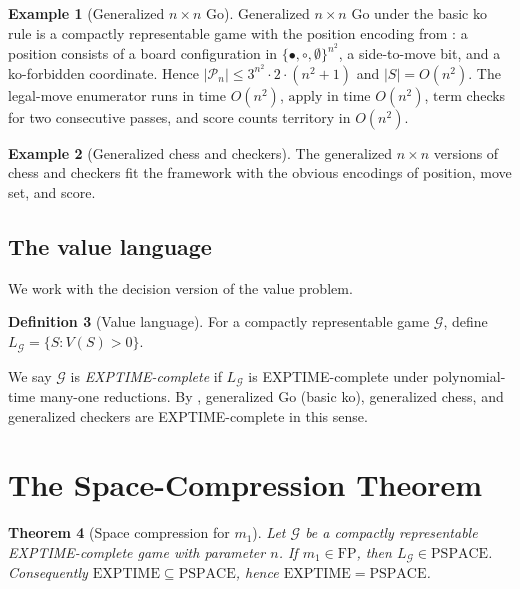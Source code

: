 \documentclass[11pt,a4paper]{amsart}
\theoremstyle{plain}
\newtheorem{theorem}{Theorem}[section]
\theoremstyle{definition}
\newtheorem{definition}[theorem]{Definition}
\newtheorem{example}[theorem]{Example}
\theoremstyle{remark}
\newcommand{\FP}{\mathrm{FP}}
\newcommand{\EXPTIME}{\mathrm{EXPTIME}}
\newcommand{\PSPACE}{\mathrm{PSPACE}}
\newcommand{\Apply}{\mathrm{apply}}
\newcommand{\score}{\mathrm{score}}
\begin{document}
\begin{example}[Generalized $n \times n$ Go]
\label{ex:go}
Generalized $n \times n$ Go under the basic ko rule is a compactly
representable game with the position encoding from \cite{Rob83}: a
position consists of a board configuration in $\{\bullet, \circ,
\emptyset\}^{n^2}$, a side-to-move bit, and a ko-forbidden coordinate.
Hence $|\mathcal{P}_n| \leq 3^{n^2} \cdot 2 \cdot (n^2 + 1)$ and
$|S| = O(n^2)$. The legal-move enumerator runs in time $O(n^2)$,
$\Apply$ in time $O(n^2)$, $\mathrm{term}$ checks for two consecutive
passes, and $\score$ counts territory in $O(n^2)$.
\end{example}

\begin{example}[Generalized chess and checkers]
\label{ex:chess}
The generalized $n \times n$ versions of chess \cite{FL81} and
checkers \cite{Rob84} fit the framework with the obvious encodings of
position, move set, and score.
\end{example}

\subsection{The value language}

We work with the decision version of the value problem.

\begin{definition}[Value language]
\label{def:VDEC}
For a compactly representable game $\mathcal{G}$, define
$L_\mathcal{G} = \{S : V(S) > 0\}$.
\end{definition}

We say $\mathcal{G}$ is \emph{EXPTIME-complete} if $L_\mathcal{G}$ is
EXPTIME-complete under polynomial-time many-one reductions.
By \cite{Rob83,FL81,Rob84}, generalized Go (basic ko), generalized
chess, and generalized checkers are EXPTIME-complete in this sense.

\section{The Space-Compression Theorem}
\label{sec:main}

\begin{theorem}[Space compression for $m_1$]
\label{thm:main}
Let $\mathcal{G}$ be a compactly representable EXPTIME-complete game
with parameter $n$. If $m_1 \in \FP$, then $L_\mathcal{G} \in \PSPACE$.
Consequently $\EXPTIME \subseteq \PSPACE$, hence $\EXPTIME = \PSPACE$.
\end{theorem}
\end{document}
